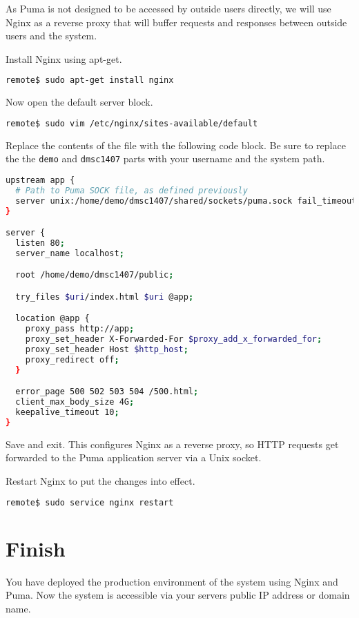 As Puma is not designed to be accessed by outside users directly,
we will use Nginx as a reverse proxy
that will buffer requests and responses between
outside users and the system.

Install Nginx using apt-get.

\begin{minipage}{\linewidth}
\begin{lstlisting}[language=bash]
remote$ sudo apt-get install nginx
\end{lstlisting}
\end{minipage}

Now open the default server block.

\begin{minipage}{\linewidth}
\begin{lstlisting}[language=bash]
remote$ sudo vim /etc/nginx/sites-available/default
\end{lstlisting}
\end{minipage}

Replace the contents of the file with the following code block.
Be sure to replace the the \texttt{demo} and \texttt{dmsc1407} parts
with your username and the system path.

\begin{minipage}{\linewidth}
  \begin{lstlisting}[language=bash, caption={/etc/nginx/sites-available/default}]
upstream app {
  # Path to Puma SOCK file, as defined previously
  server unix:/home/demo/dmsc1407/shared/sockets/puma.sock fail_timeout=0;
}

server {
  listen 80;
  server_name localhost;

  root /home/demo/dmsc1407/public;

  try_files $uri/index.html $uri @app;

  location @app {
    proxy_pass http://app;
    proxy_set_header X-Forwarded-For $proxy_add_x_forwarded_for;
    proxy_set_header Host $http_host;
    proxy_redirect off;
  }

  error_page 500 502 503 504 /500.html;
  client_max_body_size 4G;
  keepalive_timeout 10;
}
\end{lstlisting}
\end{minipage}

Save and exit. This configures Nginx as a reverse proxy, so HTTP requests
get forwarded to the Puma application server via a Unix socket.

Restart Nginx to put the changes into effect.

\begin{minipage}{\linewidth}
\begin{lstlisting}[language=bash]
remote$ sudo service nginx restart
\end{lstlisting}
\end{minipage}

\section{Finish}

You have deployed the production environment of the system using Nginx and Puma.
Now the system is accessible via your server\textquotesingle s public IP address
or domain name.
